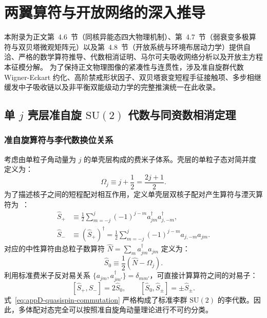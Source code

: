 \chapter{两翼算符与开放网络的深入推导}\label{app:wing-operators-networks}

本附录为正文第~4.6~节（同核异能态四大物理机制）、第~4.7~节（弱衰变多极算符与双贝塔微观矩阵元）以及第~4.8~节（开放系统与环境布居动力学）提供自洽、严格的数学算符推导、代数相消证明、马尔可夫吸收网络分析以及开放主方程本征模分解。
为了保持正文物理图像的紧凑性与连贯性，涉及准自旋群代数 Wigner-Eckart 约化、高阶禁戒形状因子、双贝塔衰变短程手征接触项、多步相继缓发中子吸收链以及非平衡双能级动力学的完整推演统一在此收录。

\section{单 $j$ 壳层准自旋 $\mathrm{SU}(2)$ 代数与同资数相消定理}\label{sec:appD-seniority-quasispin}

\subsection{准自旋算符与李代数换位关系}

考虑由单粒子角动量为 $j$ 的单壳层构成的费米子体系。壳层的单粒子态对简并度定义为：
\begin{equation}\label{eq:appD-omega-def}
\Omega_j \equiv j + \frac{1}{2} = \frac{2j + 1}{2}.
\end{equation}
为了描述核子之间的短程配对相互作用，定义单壳层双核子配对产生算符与湮灭算符为~\cite{book-jain-nuclear-isomers, book-suhonen-from-nucleons-to-nucleus}：
\begin{align}
\hat{S}_+ &\equiv \frac{1}{2} \sum_{m=-j}^j (-1)^{j-m} a_{jm}^\dagger a_{j,-m}^\dagger, \label{eq:appD-splus-def} \\
\hat{S}_- &\equiv (\hat{S}_+)^\dagger = \frac{1}{2} \sum_{m=-j}^j (-1)^{j-m} a_{j,-m} a_{jm}. \label{eq:appD-sminus-def}
\end{align}
对应的中性算符由总粒子数算符 $\hat{N} = \sum_m a_{jm}^\dagger a_{jm}$ 定义为：
\begin{equation}\label{eq:appD-szero-def}
\hat{S}_0 \equiv \frac{1}{2} \left( \hat{N} - \Omega_j \right).
\end{equation}
利用标准费米子反对易关系 $\{a_{jm}, a_{jm'}^\dagger\} = \delta_{mm'}$，可直接计算算符之间的对易子：
\begin{equation}\label{eq:appD-quasispin-commutation}
[\hat{S}_+, \hat{S}_-] = 2 \hat{S}_0, \qquad [\hat{S}_0, \hat{S}_\pm] = \pm \hat{S}_\pm.
\end{equation}
式~\eqref{eq:appD-quasispin-commutation} 严格构成了标准李群 $\mathrm{SU}(2)$ 的李代数。因此，多体配对态完全可以按照准自旋角动量理论进行不可约分类。

